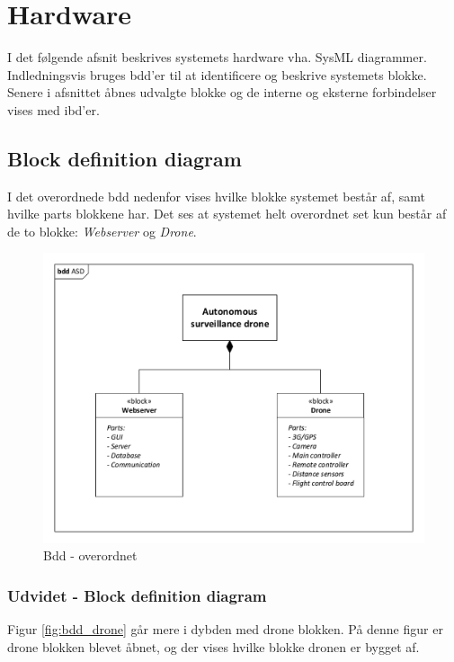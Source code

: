 \chapter{Hardware}

I det følgende afsnit beskrives systemets hardware vha. SysML diagrammer. 
Indledningsvis bruges bdd'er til at identificere og beskrive systemets blokke. Senere i afsnittet åbnes udvalgte blokke og de interne og eksterne forbindelser vises med ibd'er.

\section{Block definition diagram}
I det overordnede bdd nedenfor vises hvilke blokke systemet består af, samt hvilke parts blokkene har. Det ses at systemet helt overordnet set kun består af de to blokke: \textit{Webserver} og \textit{Drone}. 

\begin{figure}[H]
\centering
\includegraphics[width=1\textwidth]{Billeder/BDD/bdd_overordnet.pdf}
\caption{Bdd - overordnet}
\label{fig:bdd_overordnet}
\end{figure}

\newpage
\subsection{Udvidet - Block definition diagram}
Figur \ref{fig:bdd_drone} går mere i dybden med drone blokken. På denne figur er drone blokken blevet åbnet, og der vises hvilke blokke dronen er bygget af. 

